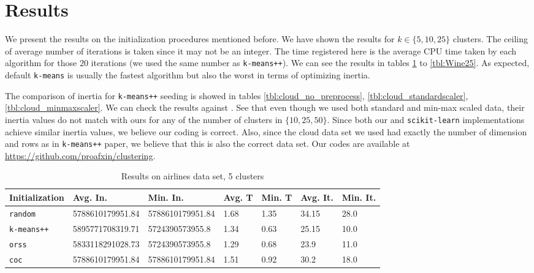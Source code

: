 \documentclass[twoside, 11pt]{article}
\begin{document}
	\section{Results}\label{sec:results}
	We present the results on the initialization procedures mentioned before. We have shown the results for $k\in\{5,10,25\}$ clusters. The ceiling of average number of iterations is taken since it may not be an integer. The time registered here is the average CPU time taken by each algorithm for those $20$ iterations (we used the same number as \texttt{k-means++}). We can see the results in tables \ref{tbl:airlines5} to \ref{tbl:Wine25}. As expected, default \texttt{k-means} is usually the fastest algorithm but also the worst in terms of optimizing inertia. 
	
	The comparison of inertia for \texttt{k-means++} seeding is showed in tables \ref{tbl:cloud_no_preprocess}, \ref{tbl:cloud_standardscaler}, \ref{tbl:cloud_minmaxscaler}. We can check the results against \citet[Table $3$]{kmeans++}. See that even though we used both standard and min-max scaled data, their inertia values do not match with ours for any of the number of clusters in $\{10,25,50\}$. Since both our and \texttt{scikit-learn} implementations achieve similar inertia values, we believe our coding is correct. Also, since the cloud data set we used had exactly the number of dimension and rows as in \texttt{k-means++} paper, we believe that this is also the correct data set. Our codes are available at \url{https://github.com/proafxin/clustering}.
		\begin{table}[p]
			\begin{center}
				\begin{tabular}{|l|l|l|l|l|l|l|}
					\hline
					Initialization & Avg. In. & Min. In. & Avg. T & Min. T & Avg. It. & Min. It.\\\hline
					\texttt{random} & 5788610179951.84 & 5788610179951.84 & 1.68 & 1.35 & 34.15 & 28.0\\\hline
					\texttt{k-means++} & 5895771708319.71 & 5724390573955.8 & 1.34 & 0.63 & 25.15 & 10.0\\\hline
					\texttt{orss} & 5833118291028.73 & 5724390573955.8 & 1.29 & 0.68 & 23.9 & 11.0\\\hline
					\texttt{coc} & 5788610179951.84 & 5788610179951.84 & 1.51 & 0.92 & 30.2 & 18.0\\\hline
				\end{tabular}
				\caption{Results on airlines data set, 5 clusters}
				\label{tbl:airlines5}
			\end{center}
		\end{table}
		
\end{document}
